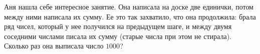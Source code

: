 Аня нашла себе интересное занятие. Она написала на доске две единички, потом между ними написала их сумму. Ее это так захватило, что она продолжила: брала ряд чисел, который у нее получился на предыдущем шаге, и между двумя соседними числами писала их сумму (старые числа при этом не стирала). Сколько раз она выписала число $1000$?